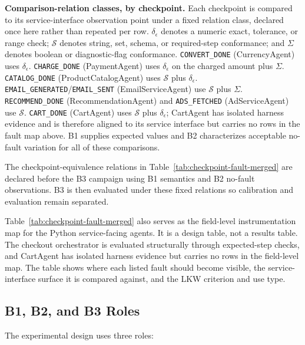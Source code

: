 \documentclass[sigconf,review,anonymous,balance=false]{acmart}
\begin{document}
\smallskip\par\noindent
\textbf{Comparison-relation classes, by checkpoint.}
Each checkpoint is compared to its service-interface observation point under a
fixed relation class, declared once here rather than repeated per row.
$\delta_{\epsilon}$ denotes a numeric exact, tolerance, or range check;
$\mathcal{S}$ denotes string, set, schema, or required-step conformance; and
$\Sigma$ denotes boolean or diagnostic-flag conformance.
\texttt{CONVERT\_DONE} (CurrencyAgent) uses $\delta_{\epsilon}$.
\texttt{CHARGE\_DONE} (PaymentAgent) uses $\delta_{\epsilon}$ on the charged
amount plus $\Sigma$.
\texttt{CATALOG\_DONE} (ProductCatalogAgent) uses $\mathcal{S}$ plus
$\delta_{\epsilon}$.
\texttt{EMAIL\_GENERATED}/\texttt{EMAIL\_SENT} (EmailServiceAgent) use
$\mathcal{S}$ plus $\Sigma$.
\texttt{RECOMMEND\_DONE} (RecommendationAgent) and \texttt{ADS\_FETCHED}
(AdServiceAgent) use $\mathcal{S}$.
\texttt{CART\_DONE} (CartAgent) uses $\mathcal{S}$ plus $\delta_{\epsilon}$;
CartAgent has isolated harness evidence and is therefore aligned to its service
interface but carries no rows in the fault map above.
B1 supplies expected values and B2 characterizes acceptable no-fault variation
for all of these comparisons.

The checkpoint-equivalence relations in
Table~\ref{tab:checkpoint-fault-merged} are declared before the B3 campaign
using B1 semantics and B2 no-fault observations. B3 is then evaluated under
these fixed relations so calibration and evaluation remain separated.

Table~\ref{tab:checkpoint-fault-merged} also serves as the field-level
instrumentation map for the Python service-facing agents. It is a design table,
not a results table. The checkout orchestrator is evaluated structurally
through expected-step checks, and CartAgent has isolated harness evidence but
carries no rows in the field-level map. The table shows where each listed fault
should become visible, the service-interface surface it is compared against,
and the LKW criterion and use type.

\subsection{B1, B2, and B3 Roles}

The experimental design uses three roles:
\end{document}
